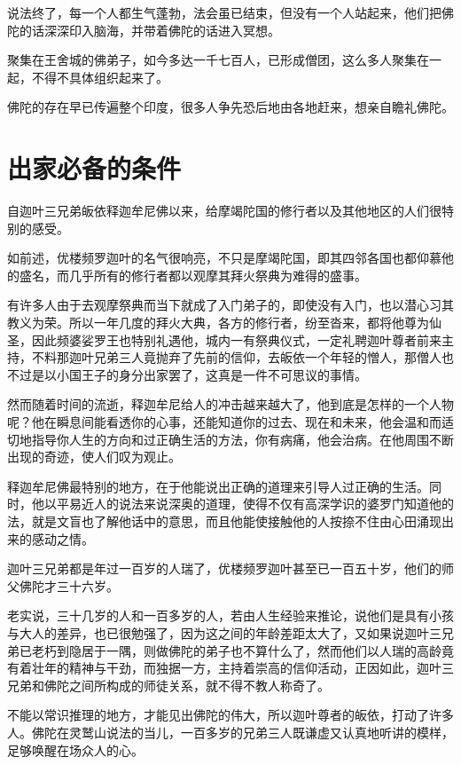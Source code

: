 \documentclass[12pt,twoside,openany]{book}
\begin{document}
说法终了，每一个人都生气蓬勃，法会虽已结束，但没有一个人站起来，他们把佛陀的话深深印入脑海，并带着佛陀的话进入冥想。

聚集在王舍城的佛弟子，如今多达一千七百人，已形成僧团，这么多人聚集在一起，不得不具体组织起来了。

佛陀的存在早已传遍整个印度，很多人争先恐后地由各地赶来，想亲自瞻礼佛陀。

\section{出家必备的条件}\label{sec3.8}

自迦叶三兄弟皈依释迦牟尼佛以来，给摩竭陀国的修行者以及其他地区的人们很特别的感受。

如前述，优楼频罗迦叶的名气很响亮，不只是摩竭陀国，即其四邻各国也都仰慕他的盛名，而几乎所有的修行者都以观摩其拜火祭典为难得的盛事。

有许多人由于去观摩祭典而当下就成了入门弟子的，即使没有入门，也以潜心习其教义为荣。所以一年几度的拜火大典，各方的修行者，纷至沓来，都将他尊为仙圣，因此频婆娑罗王也特别礼遇他，城内一有祭典仪式，一定礼聘迦叶尊者前来主持，不料那迦叶兄弟三人竟抛弃了先前的信仰，去皈依一个年轻的憎人，那僧人也不过是以小国王子的身分出家罢了，这真是一件不可思议的事情。

然而随着时间的流逝，释迦牟尼给人的冲击越来越大了，他到底是怎样的一个人物呢？他在瞬息间能看透你的心事，还能知道你的过去、现在和未来，他会温和而适切地指导你人生的方向和过正确生活的方法，你有病痛，他会治病。在他周围不断出现的奇迹，使人们叹为观止。

释迦牟尼佛最特别的地方，在于他能说出正确的道理来引导人过正确的生活。同时，他以平易近人的说法来说深奥的道理，使得不仅有高深学识的婆罗门知道他的法，就是文盲也了解他话中的意思，而且他能使接触他的人按捺不住由心田涌现出来的感动之情。

迦叶三兄弟都是年过一百岁的人瑞了，优楼频罗迦叶甚至已一百五十岁，他们的师父佛陀才三十六岁。

老实说，三十几岁的人和一百多岁的人，若由人生经验来推论，说他们是具有小孩与大人的差异，也已很勉强了，因为这之间的年龄差距太大了，又如果说迦叶三兄弟已老朽到隐居于一隅，则做佛陀的弟子也不算什么了，然而他们以人瑞的高龄竟有着壮年的精神与干劲，而独据一方，主持着崇高的信仰活动，正因如此，迦叶三兄弟和佛陀之间所构成的师徒关系，就不得不教人称奇了。

不能以常识推理的地方，才能见出佛陀的伟大，所以迦叶尊者的皈依，打动了许多人。佛陀在灵鹫山说法的当儿，一百多岁的兄弟三人既谦虚又认真地听讲的模样，足够唤醒在场众人的心。
\end{document}
